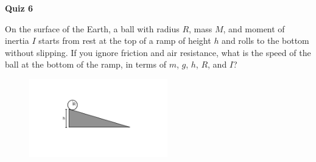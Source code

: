 \documentclass{article}
\begin{document}
\fancyfoot[C]{\thepage}
\vspace*{0cm}
\begin{center}
	{\LARGE \textbf{Quiz 6}}
\end{center}

On the surface of the Earth, a ball with radius $R$, mass $M$, and moment of inertia $I$ starts from rest at the top of a ramp of height $h$ and rolls to the bottom without slipping. If you ignore friction and air resistance, what is the speed of the ball at the bottom of the ramp, in terms of $m$, $g$, $h$, $R$, and $I$?
\begin{figure}[ht!]
	\centering
	\includegraphics[width=6cm]{rolling_motion.pdf}
\end{figure}
\end{document}

